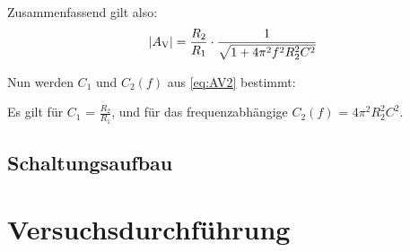 Zusammenfassend gilt also:
\begin{equation}
    |A\textsubscript{V}| = \frac{R_2}{R_1} \cdot \frac{1}{\sqrt{1 + 4 \pi^2 f^2 R_2 ^ 2 C^2}}
    \label{eq:AV3}
\end{equation}

Nun werden $C_1$ und $C_2(f)$ aus \ref{eq:AV2} bestimmt: \par
Es gilt für $C_1$ = $\frac{R_2}{R_1}$,
 und für das frequenzabhängige $C_2(f)$ = $4 \pi^2 R_2 ^ 2 C^2$.

 

\subsection{Schaltungsaufbau}

\section{Versuchsdurchführung}